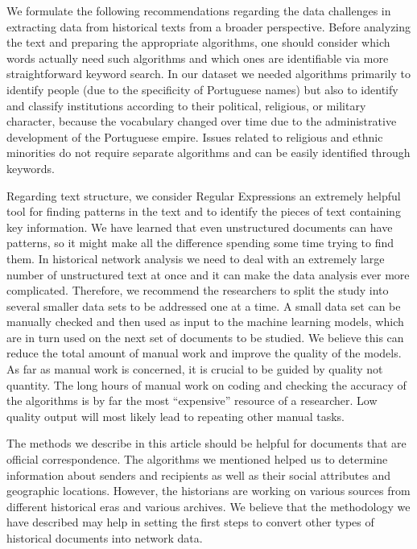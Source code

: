 \documentclass{article}
\begin{document}
We formulate the following recommendations regarding the data challenges in extracting data from historical texts from a broader perspective.  Before analyzing the text and preparing the appropriate algorithms, one should consider which words actually need such algorithms and which ones are identifiable via more straightforward keyword search. In our dataset we needed algorithms primarily to identify people (due to the specificity of Portuguese names) but also to identify and classify institutions according to their political, religious, or military character, because the vocabulary changed over time due to the administrative development of the Portuguese empire. Issues related to religious and ethnic minorities do not require separate algorithms and can be easily identified through keywords.

Regarding text structure, we consider Regular Expressions an extremely helpful tool for finding patterns in the text and to identify the pieces of text containing key information. We have learned that even unstructured documents can have patterns, so it might make all the difference spending some time trying to find them. In historical network analysis we need to deal with an extremely large number of unstructured text at once and it can make the data analysis ever more complicated. Therefore, we recommend the researchers to split the study into several smaller data sets to be addressed one at a time. A small data set can be manually checked and then used as input to the machine learning models, which are in turn used on the next set of documents to be studied. We believe this can reduce the total amount of manual work and improve the quality of the models. As far as manual work is concerned, it is crucial to be guided by quality not quantity. The long hours of manual work on coding and checking the accuracy of the algorithms is by far the most “expensive” resource of a researcher. Low quality output will most likely lead to repeating other manual tasks.

The methods we describe in this article should be helpful for documents that are official correspondence. The algorithms we mentioned helped us to determine information about senders and recipients as well as their social attributes and geographic locations. However, the historians are working on various sources from different historical eras and various archives. We believe that the methodology we have described may help in setting the first steps to convert other types of historical documents into network data.
\end{document}
